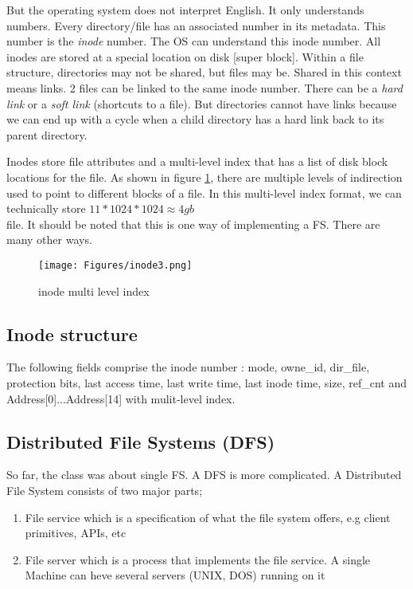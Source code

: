 \documentclass[twoside]{article}
\begin{document}
But the operating system does not interpret English. It only understands numbers. Every directory/file has an associated number in its metadata. This number is the \emph{inode} number.  The OS can understand this inode number. All inodes are stored at a special location on disk [super block].
Within a file structure, directories may not be shared, but files may be. Shared in this context means links. 2 files can be linked to the same inode number. There can be a \emph{hard link} or a \emph{soft link} (shortcuts to a file). But directories cannot have links because we can end up with a cycle when a child directory has a hard link back to its parent directory. 

\par 
Inodes store file attributes and a multi-level index that has a list of disk block locations for the file. As shown in figure \ref{inode}, there are multiple levels of indirection used to point to different blocks of a file. In this multi-level index format, we can technically store $11 * 1024 * 1024 \approx 4gb $\\ file. 
It should be noted that this is one way of implementing a FS. There are many other ways. 
\begin{figure}[htbp]
\centering
\texttt{[image: Figures/inode3.png]}
\caption{inode multi level index} \label{inode}
\end{figure}

\subsection{Inode structure}

The following fields comprise the inode number : mode, owne\_id, dir\_file, protection bits, last access time, last write time, last inode time, size, ref\_cnt and Address[0]...Address[14] with mulit-level index.

\subsection{Distributed File Systems (DFS)}
So far, the class was about single FS. A DFS is  more complicated. A Distributed File System consists of two major parts;
\begin{enumerate}
    \item File service which is a specification of what the file system offers, e.g client primitives, APIs, etc
    \item File server which is a process that implements the file service. A single Machine can heve several servers (UNIX, DOS) running on it
\end{enumerate}
\end{document}
